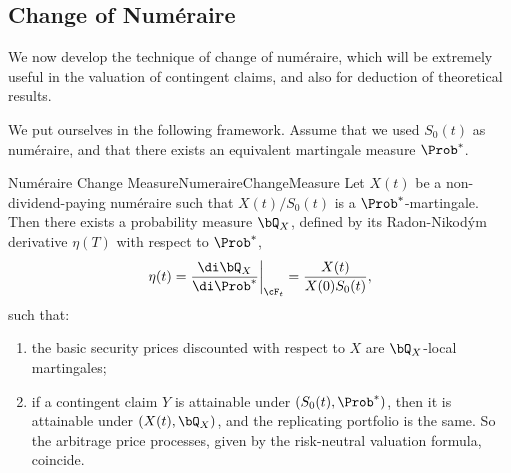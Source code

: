 \subsection{Change of Num\'{e}raire}

We now develop the technique of change of num\'{e}raire, which will be extremely useful in the valuation of contingent claims, and also for deduction of theoretical results.

We put ourselves in the following framework. Assume that we used \(S_0(t)\) as num\'{e}raire, and that there exists an equivalent martingale measure \(\Prob^*\).

\begin{thm}{Numéraire Change Measure}{NumeraireChangeMeasure}
	Let \(X(t)\) be a non-dividend-paying num\'{e}raire such that \(X(t)/S_0(t)\) is a \(\Prob^*\)-martingale. Then there exists a probability measure \(\bQ_X\), defined by its Radon-Nikodým derivative \(\eta(T)\) with respect to \(\Prob^*\),
	\[
		\eta(t) = \frac{\di \bQ_X}{\di \Prob^*} \bigg|_{\cF_t} = \frac{X(t)}{X(0)S_0(t)},
	\]
	such that:
	\begin{enumerate}[label=(\roman*), ref=(\roman*), leftmargin=*]
		\item the basic security prices discounted with respect to \(X\) are \(\bQ_X\)-local martingales;
		\item if a contingent claim \(Y\) is attainable under \((S_0(t), \Prob^*)\), then it is attainable under \((X(t), \bQ_X)\), and the replicating portfolio is the same. So the arbitrage price processes, given by the risk-neutral valuation formula, coincide.
	\end{enumerate}
\end{thm}


